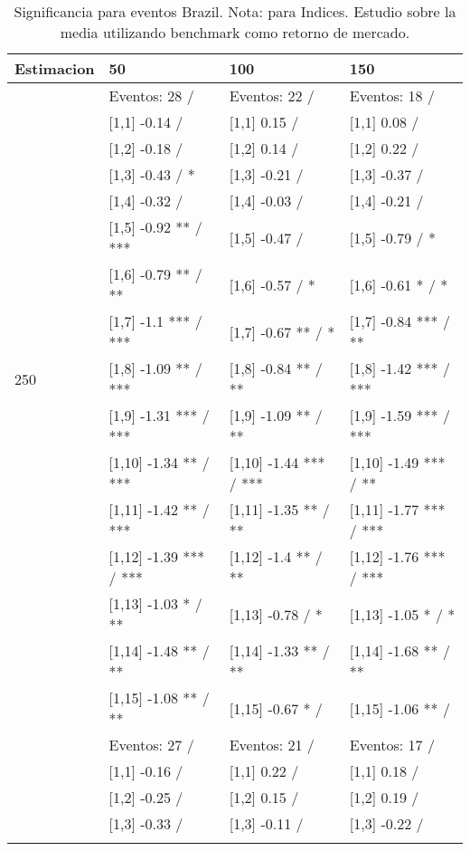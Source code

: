 \begin{table}

\caption{Significancia para eventos Brazil. Nota: para Indices. Estudio sobre la media utilizando benchmark como retorno de mercado.}
\centering
\begin{tabular}[t]{llll}
\toprule
Estimacion & 50 & 100 & 150\\
\midrule
 & Eventos:  28 / & Eventos:  22 / & Eventos:  18 /\\
 & {}[1,1] -0.14  / & {}[1,1] 0.15  / & {}[1,1] 0.08  /\\
 & {}[1,2] -0.18  / & {}[1,2] 0.14  / & {}[1,2] 0.22  /\\
 & {}[1,3] -0.43  / * & {}[1,3] -0.21  / & {}[1,3] -0.37  /\\
 & {}[1,4] -0.32  / & {}[1,4] -0.03  / & {}[1,4] -0.21  /\\
\addlinespace
 & {}[1,5] -0.92 ** / *** & {}[1,5] -0.47  / & {}[1,5] -0.79  / *\\
 & {}[1,6] -0.79 ** / ** & {}[1,6] -0.57  / * & {}[1,6] -0.61 * / *\\
 & {}[1,7] -1.1 *** / *** & {}[1,7] -0.67 ** / * & {}[1,7] -0.84 *** / **\\
250 & {}[1,8] -1.09 ** / *** & {}[1,8] -0.84 ** / ** & {}[1,8] -1.42 *** / ***\\
 & {}[1,9] -1.31 *** / *** & {}[1,9] -1.09 ** / ** & {}[1,9] -1.59 *** / ***\\
\addlinespace
 & {}[1,10] -1.34 ** / *** & {}[1,10] -1.44 *** / *** & {}[1,10] -1.49 *** / **\\
 & {}[1,11] -1.42 ** / *** & {}[1,11] -1.35 ** / ** & {}[1,11] -1.77 *** / ***\\
 & {}[1,12] -1.39 *** / *** & {}[1,12] -1.4 ** / ** & {}[1,12] -1.76 *** / ***\\
 & {}[1,13] -1.03 * / ** & {}[1,13] -0.78  / * & {}[1,13] -1.05 * / *\\
 & {}[1,14] -1.48 ** / ** & {}[1,14] -1.33 ** / ** & {}[1,14] -1.68 ** / **\\
\addlinespace
 & {}[1,15] -1.08 ** / ** & {}[1,15] -0.67 * / & {}[1,15] -1.06 ** /\\
 & Eventos:  27 / & Eventos:  21 / & Eventos:  17 /\\
 & {}[1,1] -0.16  / & {}[1,1] 0.22  / & {}[1,1] 0.18  /\\
 & {}[1,2] -0.25  / & {}[1,2] 0.15  / & {}[1,2] 0.19  /\\
 & {}[1,3] -0.33  / & {}[1,3] -0.11  / & {}[1,3] -0.22  /\\
\addlinespace

\end{tabular}
\end{table}

